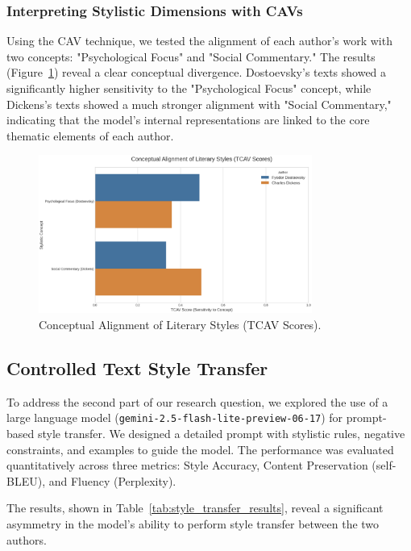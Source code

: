 \documentclass[sn-mathphys]{sn-jnl}%
\begin{document}
\subsubsection{Interpreting Stylistic Dimensions with CAVs}\label{subsubsec3.1.3}
Using the CAV technique, we tested the alignment of each author's work with two concepts: "Psychological Focus" and "Social Commentary." The results (Figure~\ref{fig:cav}) reveal a clear conceptual divergence. Dostoevsky's texts showed a significantly higher sensitivity to the "Psychological Focus" concept, while Dickens's texts showed a much stronger alignment with "Social Commentary," indicating that the model's internal representations are linked to the core thematic elements of each author.

\begin{figure}[h]
    \centering
    \includegraphics[width=0.8\textwidth]{CTAV Scores.png} %
    \caption{Conceptual Alignment of Literary Styles (TCAV Scores).}\label{fig:cav}
\end{figure}

\subsection{Controlled Text Style Transfer}\label{subsec3.2}

To address the second part of our research question, we explored the use of a large language model (\texttt{gemini-2.5-flash-lite-preview-06-17}) for prompt-based style transfer. We designed a detailed prompt with stylistic rules, negative constraints, and examples to guide the model. The performance was evaluated quantitatively across three metrics: Style Accuracy, Content Preservation (self-BLEU), and Fluency (Perplexity).

The results, shown in Table~\ref{tab:style_transfer_results}, reveal a significant asymmetry in the model's ability to perform style transfer between the two authors.
\end{document}
